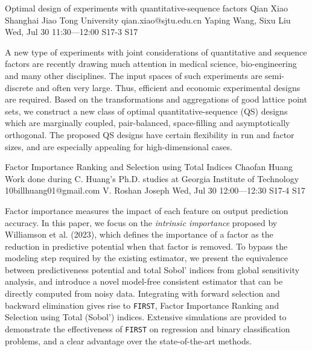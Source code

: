 \begin{talk}
  {Optimal design of experiments with quantitative-sequence factors}%
  {Qian Xiao}%
  {Shanghai Jiao Tong University}%
  {qian.xiao@sjtu.edu.cn}%
  {Yaping Wang, Sixu Liu}%
  {}%
  {Wed, Jul 30 11:30---12:00}%
  {S17-3}%
  {S17}%
  
    
   
A new type of experiments with joint considerations of quantitative and sequence factors are recently drawing much attention in medical science, bio-engineering and many other disciplines. The input spaces of such experiments are semi-discrete and often very large. Thus, efficient and economic experimental designs are required. Based on the transformations and aggregations of good lattice point sets, we construct a new class of optimal quantitative-sequence (QS) designs which are marginally coupled, pair-balanced, space-filling and asymptotically orthogonal. The proposed QS designs have certain flexibility in run and factor sizes, and are especially appealing for high-dimensional cases.

\end{talk}

\begin{talk}
  {Factor Importance Ranking and Selection using Total Indices}%
  {Chaofan Huang}%
  {Work done during C. Huang's Ph.D. studies at Georgia Institute of Technology}%
  {10billhuang01@gmail.com}%
  {V. Roshan Joseph}%
  {}%
  {Wed, Jul 30 12:00---12:30}%
  {S17-4}%
  {S17}%
  
    
   
Factor importance measures the impact of each feature on output prediction accuracy. In this paper, we focus on the \emph{intrinsic importance} proposed by Williamson et al. (2023), which defines the importance of a factor as the reduction in predictive potential when that factor is removed. To bypass the modeling step required by the existing estimator, we present the equivalence between predictiveness potential and total Sobol' indices from global sensitivity analysis, and introduce a novel model-free consistent estimator that can be directly computed from noisy data. Integrating with forward selection and backward elimination gives rise to \texttt{FIRST}, Factor Importance Ranking and Selection using Total (Sobol') indices. Extensive simulations are provided to demonstrate the effectiveness of \texttt{FIRST} on regression and binary classification problems, and a clear advantage over the state-of-the-art methods.
\end{talk}

